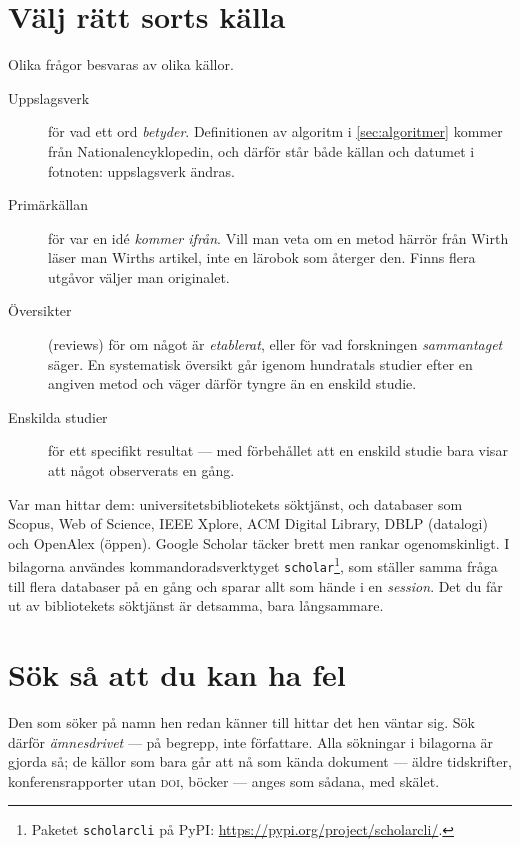 \section{Välj rätt sorts källa}

Olika frågor besvaras av olika källor.
\begin{description}
  \item[Uppslagsverk] för vad ett ord \emph{betyder}.  Definitionen av
    algoritm i \cref{sec:algoritmer} kommer från Nationalencyklopedin, och
    därför står både källan och datumet i fotnoten: uppslagsverk ändras.
  \item[Primärkällan] för var en idé \emph{kommer ifrån}.  Vill man veta
    om en metod härrör från Wirth läser man Wirths artikel, inte en
    lärobok som återger den.  Finns flera utgåvor väljer man originalet.
  \item[Översikter] (\foreignlanguage{english}{reviews}) för om något är
    \emph{etablerat}, eller för vad forskningen \emph{sammantaget} säger.
    En systematisk översikt går igenom hundratals studier efter en angiven
    metod och väger därför tyngre än en enskild studie.
  \item[Enskilda studier] för ett specifikt resultat --- med förbehållet
    att en enskild studie bara visar att något observerats en gång.
\end{description}
Var man hittar dem: universitetsbibliotekets söktjänst, och databaser som
Scopus, Web of Science, IEEE Xplore, ACM Digital Library, DBLP (datalogi)
och OpenAlex (öppen).  Google Scholar täcker brett men rankar
ogenomskinligt.  I bilagorna användes kommandoradsverktyget
\texttt{scholar}\footnote{Paketet \texttt{scholarcli} på PyPI:
  \url{https://pypi.org/project/scholarcli/}.}, som ställer samma fråga till flera databaser på en gång
och sparar allt som hände i en \emph{session}.  Det du får ut av
bibliotekets söktjänst är detsamma, bara långsammare.

\section{Sök så att du kan ha fel}

Den som söker på namn hen redan känner till hittar det hen väntar sig.
Sök därför \emph{ämnesdrivet} --- på begrepp, inte författare.  Alla
sökningar i bilagorna är gjorda så; de källor som bara går att nå som
kända dokument --- äldre tidskrifter, konferensrapporter utan
\textsc{doi}, böcker --- anges som sådana, med skälet.

